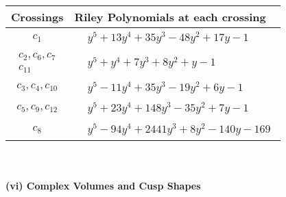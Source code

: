 \documentclass[1p]{elsarticle_modified}
\theoremstyle{definition}
\begin{document}
\begin{tabular}{m{50pt}|m{274pt}}
Crossings & \hspace{64pt}Riley Polynomials at each crossing \\
\hline $$\begin{aligned}c_{1}\end{aligned}$$&$\begin{aligned}
&y^5+13 y^4+35 y^3-48 y^2+17 y-1
\end{aligned}$\\
\hline $$\begin{aligned}c_{2},c_{6},c_{7}\\c_{11}\end{aligned}$$&$\begin{aligned}
&y^5+y^4+7 y^3+8 y^2+y-1
\end{aligned}$\\
\hline $$\begin{aligned}c_{3},c_{4},c_{10}\end{aligned}$$&$\begin{aligned}
&y^5-11 y^4+35 y^3-19 y^2+6 y-1
\end{aligned}$\\
\hline $$\begin{aligned}c_{5},c_{9},c_{12}\end{aligned}$$&$\begin{aligned}
&y^5+23 y^4+148 y^3-35 y^2+7 y-1
\end{aligned}$\\
\hline $$\begin{aligned}c_{8}\end{aligned}$$&$\begin{aligned}
&y^5-94 y^4+2441 y^3+8 y^2-140 y-169
\end{aligned}$\\
\hline
\end{tabular}\\~\\
\newpage\flushleft \textbf{(vi) Complex Volumes and Cusp Shapes}
\end{document}
